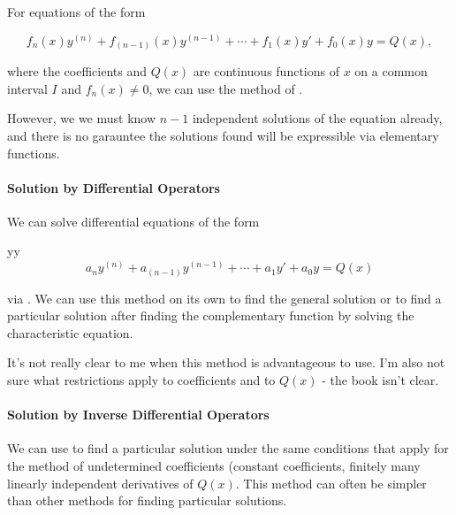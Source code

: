 \documentclass{article}
\begin{document}
For equations of the form

\[ f_n(x)y^{(n)} + f_{(n-1)}(x)y^{(n-1)} + \cdots + f_1(x)y' + f_0(x)y = Q(x), \]

where the coefficients and $Q(x)$ are \@{continuous} functions of $x$ on a common interval $I$ and $f_n(x) \neq 0$, we can use the method of .

However, we we must know $n - 1$ independent solutions of the equation already, and there is no garauntee the solutions found will be expressible via elementary functions.

\paragraph{Solution by Differential Operators}

We can solve differential equations of the form

yy\[ a_ny^{(n)} + a_{(n-1)}y^{(n-1)} + \cdots + a_1y' + a_0y = Q(x) \]

via . We can use this method on its own to find the general solution or to find a particular solution after finding the complementary function by solving the characteristic equation.

It's not really clear to me when this method is advantageous to use. I'm also not sure what restrictions apply to coefficients and to $Q(x)$ - the book isn't clear.

\paragraph{Solution by Inverse Differential Operators}

We can use  to find a particular solution under the same conditions that apply for the method of undetermined coefficients (constant coefficients, finitely many linearly independent derivatives of $Q(x)$. This method can often be simpler than other methods for finding particular solutions.
\end{document}
